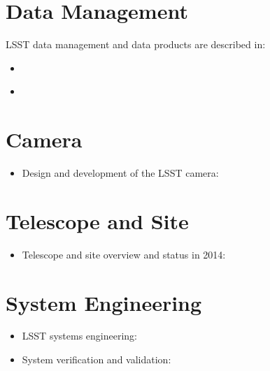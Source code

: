 \documentclass[12pt]{article}
\begin{document}
\section{Data Management}

LSST data management and data products are described in: 

\begin{itemize}
  \item \cite{DPDD}
  \item \cite{DMDesign}
\end{itemize}


\section{Camera}

\begin{itemize}
   \item Design and development of the LSST camera: \cite{2010SPIE.7735E..0JK}
\end{itemize}


\section{Telescope and Site}

\begin{itemize}
   \item Telescope and site overview and status in 2014:  \cite{2014SPIE.9145E..1AG}
\end{itemize}

\section{System Engineering}

\begin{itemize}
   \item LSST systems engineering: \cite{2014SPIE.9150E..0MC}
   \item System verification and validation: \cite{2014SPIE.9150E..0NS}
\end{itemize}
%



\printbibliography[heading=bibintoc]
\end{document}
